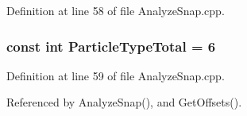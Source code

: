 Definition at line 58 of file AnalyzeSnap.cpp.

\subsubsection[{ParticleTypeTotal}]{\setlength{\rightskip}{0pt plus 5cm}const int {\bf ParticleTypeTotal} = 6}\label{AnalyzeSnap_8cpp_a26cdc03eddc01de73d2183283e42f8ca}


Definition at line 59 of file AnalyzeSnap.cpp.



Referenced by AnalyzeSnap(), and GetOffsets().

